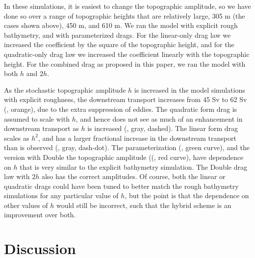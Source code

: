 \documentclass[twocol]{ametsocV5}
\begin{document}
In these simulations, it is easiest to change the topographic amplitude, so we have done so over a range of topographic heights that are relatively large, 305 m (the cases shown above), 450 m, and 610 m. We ran the model with explicit rough bathymetry, and with parameterized drags.  For the linear-only drag law we increased the coefficient by the square of the topographic height, and for the quadratic-only drag law we increased the coefficient linearly with the topographic height.  For the combined drag as proposed in this paper, we ran the model with both $h$ and $2h$.

As the stochastic topographic amplitude $h$ is increased in the model simulations with explicit roughness, the downstream transport increases from 45 Sv to 62 Sv (, orange), due to the extra suppression of eddies.  The quadratic form drag is assumed to scale with $h$, and hence does not see as much of an enhancement in downstream transport as $h$ is increased (, gray, dashed).  The linear form drag scales as $h^2$, and has a larger fractional increase in the downstream transport than is observed (, gray, dash-dot).  The parameterization (, green curve), and the version with {\sc Double} the topographic amplitude ((, red curve),  have  dependence on $h$ that is very similar to the explicit bathymetry simulation. The {\sc Double} drag law with $2h$ also has the correct amplitudes.  Of course, both the linear or quadratic drags could have been tuned to better match the rough bathymetry simulations for any particular value of $h$, but the point is that the dependence on other values of $h$ would still be incorrect, such that the hybrid scheme is an improvement over both.

\clearpage
\section{Discussion}
\end{document}
